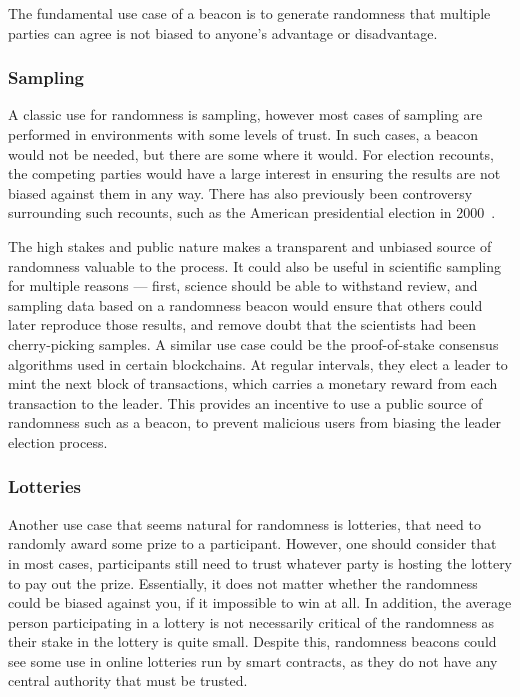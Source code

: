 The fundamental use case of a beacon is to generate randomness that multiple parties can agree is not biased to anyone's advantage or disadvantage.

\subsubsection{Sampling}
A classic use for randomness is sampling, however most cases of sampling are performed in environments with some levels of trust.
In such cases, a beacon would not be needed, but there are some where it would.
For election recounts, the competing parties would have a large interest in ensuring the results are not biased against them in any way.
There has also previously been controversy surrounding such recounts, such as the American presidential election in 2000~\cite{bushgore}.

The high stakes and public nature makes a transparent and unbiased source of randomness valuable to the process.
It could also be useful in scientific sampling for multiple reasons --- first, science should be able to withstand review, and sampling data based on a randomness beacon would ensure that others could later reproduce those results, and remove doubt that the scientists had been cherry-picking samples.
A similar use case could be the proof-of-stake consensus algorithms used in certain blockchains.
At regular intervals, they elect a leader to mint the next block of transactions, which carries a monetary reward from each transaction to the leader.
This provides an incentive to use a public source of randomness such as a beacon, to prevent malicious users from biasing the leader election process.

\subsubsection{Lotteries}
Another use case that seems natural for randomness is lotteries, that need to randomly award some prize to a participant. However, one should consider that in most cases, participants still need to trust whatever party is hosting the lottery to pay out the prize. Essentially, it does not matter whether the randomness could be biased against you, if it impossible to win at all.
In addition, the average person participating in a lottery is not necessarily critical of the randomness as their stake in the lottery is quite small.
Despite this, randomness beacons could see some use in online lotteries run by smart contracts, as they do not have any central authority that must be trusted.

